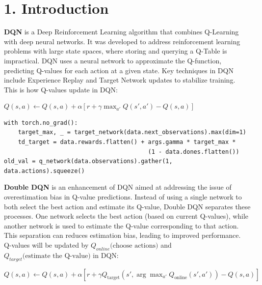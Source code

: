\documentclass[english, a4paper,12pt]{article}
\begin{document}
\section*{1. Introduction}
\hspace*{5mm} \textbf{DQN} is a Deep Reinforcement Learning algorithm that combines Q-Learning with deep neural networks. It was developed to address reinforcement learning problems with large state spaces, where storing and querying a Q-Table is impractical. DQN uses a neural network to approximate the Q-function, predicting Q-values for each action at a given state. Key techniques in DQN include Experience Replay and Target Network updates to stabilize training.
\\
\hspace*{5mm} This is how Q-values update in DQN:
\begin{center}
$Q(s, a) \leftarrow Q(s, a) + \alpha \left[ r + \gamma \max_{a'} Q(s', a') - Q(s, a) \right]$
\end{center}
\vspace*{-4.5mm}
\begin{verbatim}
with torch.no_grad():
    target_max, _ = target_network(data.next_observations).max(dim=1)
    td_target = data.rewards.flatten() + args.gamma * target_max * 
                                         (1 - data.dones.flatten())
old_val = q_network(data.observations).gather(1, data.actions).squeeze()
\end{verbatim}
\hspace*{5mm} \textbf{Double DQN} is an enhancement of DQN aimed at addressing the issue of overestimation bias in Q-value predictions. Instead of using a single network to both select the best action and estimate its Q-value, Double DQN separates these processes. One network selects the best action (based on current Q-values), while another network is used to estimate the Q-value corresponding to that action. This separation can reduces estimation bias, leading to improved performance.\\
\hspace*{5mm} Q-values will be updated by $Q_{online}\text{(choose actions)}$ and $Q_{target}\text{(estimate the Q-value)}$ in DQN:
\begin{center}
    $Q(s, a) \leftarrow Q(s, a) + \alpha \left[ r + \gamma Q_{\text{target}}(s', \arg\max_{a'} Q_{\text{online}}(s', a')) - Q(s, a) \right]$
\end{center}
\vspace*{-4.5mm}
\end{document}
